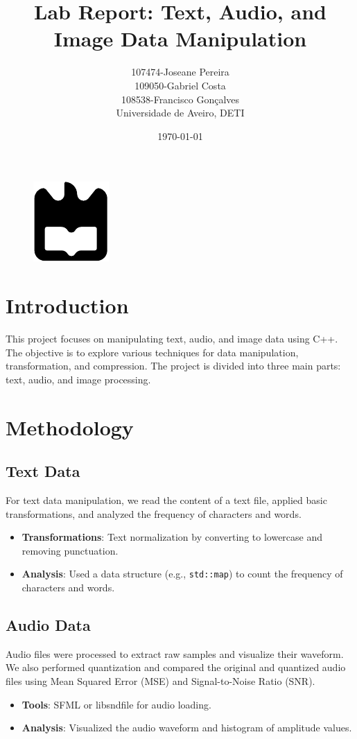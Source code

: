 \documentclass[a4paper,12pt]{article}
\title{Lab Report: Text, Audio, and Image Data Manipulation}
\author{107474-Joseane Pereira \\
109050-Gabriel Costa \\
108538-Francisco Gonçalves \\
Universidade de Aveiro, DETI}
\date{\today}
\begin{document}
\begin{figure}
    \centering
    \includegraphics[width=0.3\linewidth]{ua.pdf}
    \label{fig:enter-label}
\end{figure}
\maketitle
\newpage
\tableofcontents
\newpage

\section{Introduction}
This project focuses on manipulating text, audio, and image data using C++. The objective is to explore various techniques for data manipulation, transformation, and compression. The project is divided into three main parts: text, audio, and image processing.

\section{Methodology}
\subsection{Text Data}
For text data manipulation, we read the content of a text file, applied basic transformations, and analyzed the frequency of characters and words.
\begin{itemize}
    \item \textbf{Transformations}: Text normalization by converting to lowercase and removing punctuation.
    \item \textbf{Analysis}: Used a data structure (e.g., \texttt{std::map}) to count the frequency of characters and words.
\end{itemize}

\subsection{Audio Data}
Audio files were processed to extract raw samples and visualize their waveform. We also performed quantization and compared the original and quantized audio files using Mean Squared Error (MSE) and Signal-to-Noise Ratio (SNR).
\begin{itemize}
    \item \textbf{Tools}: SFML or libsndfile for audio loading.
    \item \textbf{Analysis}: Visualized the audio waveform and histogram of amplitude values.
\end{itemize}
\end{document}
